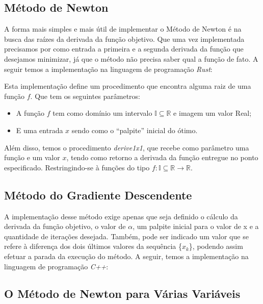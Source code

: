 
\hspace{0.8cm}
\subsection{Método de Newton}

\hspace{0.8cm}
A forma mais simples e mais útil de implementar o Método de Newton é na
busca das raízes da derivada da função objetivo. Que uma vez implementada
precisamos por como entrada a primeira e a segunda derivada da função que
desejamos minimizar, já que o método não precisa saber qual a função de fato.
A seguir temos a implementação na linguagem de programação \textit{Rust}:
\vspace{0.2cm}


Esta implementação define um procedimento que encontra alguma raiz de uma função
$f$. Que tem os seguintes parâmetros:

    \begin{itemize}
        \item A função $f$ tem como domínio um intervalo
            \(\mathbb{I} \subseteq \mathbb{R}\) e imagem um valor Real;

        \item E uma entrada $x$ sendo como o ``palpite'' inicial do ótimo.
    \end{itemize}


Além disso, temos o procedimento \textit{derive1x1}, que recebe como parâmetro
uma função e um valor $x$, tendo como retorno a derivada da função entregue
no ponto especificado. Restringindo-se à funções do tipo
\(f : \mathbb{I} \subseteq \mathbb{R} \rightarrow \mathbb{R}\).


\subsection{Método do Gradiente Descendente}

\hspace{0.8cm}
A implementação desse método exige apenas que seja definido o cálculo
da derivada da função objetivo, o valor de $\alpha$, um palpite inicial para
o valor de x e a quantidade de iterações desejada. Também, pode ser
indicado um valor que se refere à diferença dos dois últimos valores
da sequência \{$x_k$\}, podendo assim efetuar a parada da execução do
método. A seguir, temos a implementação na linguagem de programação
\textit{C++}:

\vspace{0.2cm}



\textcolor[rgb]{1,0,0}{\section{{O Método de Newton para Várias Variáveis}}}
